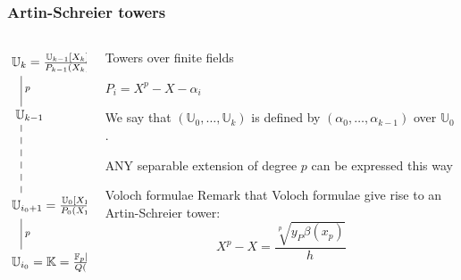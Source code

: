 \documentclass[10pt]{beamer}
\newcommand{\K}{\mathbb{K}}  %
\newcommand{\U}{\mathbb{U}}  %
\newcommand{\F}{\mathbb{F}}  %
\newcommand{\0}{\mathcal{O}}  %
\begin{document}
\begin{frame}
  \frametitle{Artin-Schreier towers}

  \begin{columns}
    \begin{column}{0.3\textwidth}
      \Large\[\xymatrix{
        *+[r]{\U_k = \frac{\U_{k-1}[X_k]}{P_{k-1}(X_k)}}\ar@{-}[d]^p\\
        *+[r]{\U_{k-1}} \ar@{--}[dd]\\
        \\
        *+[r]{\U_{i_0+1} = \frac{\U_0[X_1]}{P_0(X_1)}} \ar@{-}[d]^p\\
        *+[r]{\U_{i_0} = \K = \frac{\F_p[X_0]}{Q(X_0)}}
      }\]
    \end{column}
    \begin{column}{0.65\textwidth}
      \begin{block}{Towers over finite fields}
        \smallskip
        \begin{center}
          \Large$P_i = X^p - X - \alpha_i$
        \end{center}

        \begin{center}
          We say that $(\U_0,\ldots,\U_k)$ is defined by
          $(\alpha_0,\ldots,\alpha_{k-1})$ over $\U_0$.
        \end{center}
        \begin{center}
          \alert{ANY} separable extension of degree $p$ can be
          expressed this way
        \end{center}
      \end{block}

      \begin{block}{Voloch formulae}
        Remark that Voloch formulae give rise to an Artin-Schreier
        tower:
        \[X^p - X = \frac{\sqrt[p]{y_P\beta(x_p)}}{h}\]
      \end{block}
    \end{column}
  \end{columns}
\end{frame}

\end{document}
